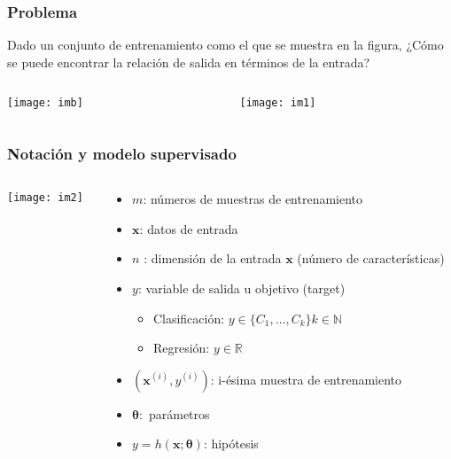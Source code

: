 \documentclass[spanish]{beamer}
\begin{document}
\begin{frame}
\frametitle{Problema}
 
Dado un conjunto de entrenamiento como el que se muestra en la figura, ¿Cómo se puede encontrar la relación de salida en términos de la entrada?
\begin{columns}
\begin{column}{0.3\textwidth}
\begin{center}
\texttt{[image: imb]}
\end{center}

\end{column}
\begin{column}{0.7\textwidth}
\begin{center}
\texttt{[image: im1]}
\end{center}
\end{column}
\end{columns}
\end{frame}




\begin{frame}
\frametitle{Notación y modelo supervisado}

\begin{columns}
\begin{column}{0.3\textwidth}
\begin{center}
\texttt{[image: im2]}
\end{center}
\end{column}
\begin{column}{0.7\textwidth}
\begin{itemize}
\item $m$: números de muestras de entrenamiento 
\item $\mathbf{x}$: datos de entrada 
\item $n$ : dimensión de la entrada  $\mathbf{x}$ (número de características)
\item $y$: variable de salida u objetivo (target)
 \begin{itemize}
\item Clasificación: $y \in \lbrace C_{1},\ldots , C_{k}\rbrace k\in \mathbb{N}$
\item Regresión: $ y \in \mathbb{R}$  

\end{itemize} 
\item $(\mathbf{x}^{(i)},y^{(i)})$: i-ésima muestra de entrenamiento 
\item $\boldsymbol{\theta}:$ parámetros 
\item $y=h(\mathbf{x};\boldsymbol{\theta})$: hipótesis
\end{itemize}
\end{column}
\end{columns}

\end{frame}
\end{document}
